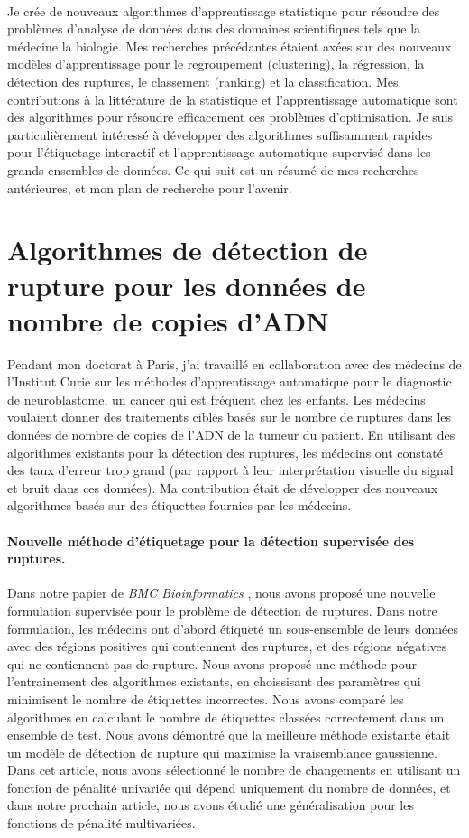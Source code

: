 \documentclass{article}
\begin{document}
\mbox{ }

Je crée de nouveaux algorithmes d'apprentissage statistique pour
résoudre des problèmes d'analyse de données dans des domaines
scientifiques tels que la médecine la biologie. Mes recherches
précédantes étaient axées sur des nouveaux modèles d'apprentissage
pour le regroupement (clustering), la régression, la détection des
ruptures, le classement (ranking) et la classification. Mes
contributions à la littérature de la statistique et l'apprentissage
automatique sont des algorithmes pour résoudre efficacement ces
problèmes d'optimisation. Je suis particulièrement intéressé à
développer des algorithmes suffisamment rapides pour l'étiquetage
interactif et l'apprentissage automatique supervisé dans les grands
ensembles de données. Ce qui suit est un résumé de mes recherches
antérieures, et mon plan de recherche pour l'avenir.

\section{Algorithmes de détection de rupture pour les données de nombre de copies d'ADN}

Pendant mon doctorat à Paris, j'ai travaillé en collaboration avec des
médecins de l'Institut Curie sur les méthodes d'apprentissage
automatique pour le diagnostic de neuroblastome, un cancer qui est
fréquent chez les enfants. Les médecins voulaient donner des
traitements ciblés basés sur le nombre de ruptures dans les données de
nombre de copies de l'ADN de la tumeur du patient. En utilisant des
algorithmes existants pour la détection des ruptures, les médecins ont
constaté des taux d'erreur trop grand (par rapport à leur
interprétation visuelle du signal et bruit dans ces données). Ma
contribution était de développer des nouveaux algorithmes basés sur
des étiquettes fournies par les médecins.

\paragraph{Nouvelle méthode d'étiquetage pour la détection supervisée des ruptures.}

Dans notre papier de \emph{BMC Bioinformatics}
\citep{HOCKING-breakpoints}, nous avons proposé une nouvelle
formulation supervisée pour le problème de détection de ruptures. Dans
notre formulation, les médecins ont d'abord étiqueté un sous-ensemble
de leurs données avec des régions positives qui contiennent des
ruptures, et des régions négatives qui ne contiennent pas de rupture.
Nous avons proposé une méthode pour l'entrainement des algorithmes
existants, en choissisant des paramètres qui minimisent le nombre de
étiquettes incorrectes. Nous avons comparé les algorithmes en
calculant le nombre de étiquettes classées correctement dans un
ensemble de test. Nous avons démontré que la meilleure méthode
existante était un modèle de détection de rupture qui maximise la
vraisemblance gaussienne.  Dans cet article, nous avons sélectionné le
nombre de changements en utilisant un fonction de pénalité univariée
qui dépend uniquement du nombre de données, et dans notre prochain
article, nous avons étudié une généralisation pour les fonctions de
pénalité multivariées.
\end{document}
